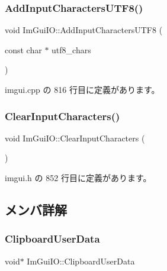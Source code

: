 \subsubsection{\texorpdfstring{Add\+Input\+Characters\+U\+T\+F8()}{AddInputCharactersUTF8()}}
{\footnotesize\ttfamily void Im\+Gui\+I\+O\+::\+Add\+Input\+Characters\+U\+T\+F8 (\begin{DoxyParamCaption}\item[{const char $\ast$}]{utf8\+\_\+chars }\end{DoxyParamCaption})}



 imgui.\+cpp の 816 行目に定義があります。

\mbox{\label{struct_im_gui_i_o_a82d8794e14e628efbb026af4202c70ca}} 
\subsubsection{\texorpdfstring{Clear\+Input\+Characters()}{ClearInputCharacters()}}
{\footnotesize\ttfamily void Im\+Gui\+I\+O\+::\+Clear\+Input\+Characters (\begin{DoxyParamCaption}{ }\end{DoxyParamCaption})\hspace{0.3cm}{\ttfamily [inline]}}



 imgui.\+h の 852 行目に定義があります。



\subsection{メンバ詳解}
\mbox{\label{struct_im_gui_i_o_a162d9da988e8985df05d262640f2f91c}} 
\subsubsection{\texorpdfstring{Clipboard\+User\+Data}{ClipboardUserData}}
{\footnotesize\ttfamily void$\ast$ Im\+Gui\+I\+O\+::\+Clipboard\+User\+Data}



